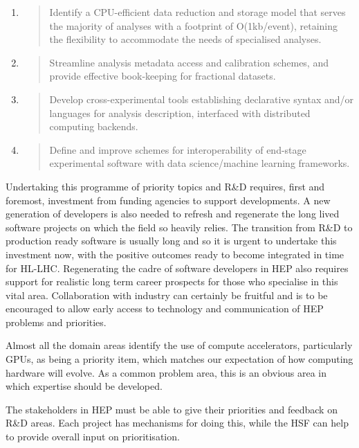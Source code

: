 \documentclass[10pt,a4paper]{article}
\begin{document}
\begin{enumerate}
\def\labelenumi{\arabic{enumi}.}
\item
  \begin{quote}
  Identify a CPU-efficient data reduction and storage model that serves
  the majority of analyses with a footprint of O(1kb/event), retaining
  the flexibility to accommodate the needs of specialised analyses.
  \end{quote}
\item
  \begin{quote}
  Streamline analysis metadata access and calibration schemes, and
  provide effective book-keeping for fractional datasets.
  \end{quote}
\item
  \begin{quote}
  Develop cross-experimental tools establishing declarative syntax
  and/or languages for analysis description, interfaced with distributed
  computing backends.
  \end{quote}
\item
  \begin{quote}
  Define and improve schemes for interoperability of end-stage
  experimental software with data science/machine learning frameworks.
  \end{quote}
\end{enumerate}

Undertaking this programme of priority topics and R\&D requires, first
and foremost, investment from funding agencies to support developments.
A new generation of developers is also needed to refresh and regenerate
the long lived software projects on which the field so heavily relies.
The transition from R\&D to production ready software is usually long
and so it is urgent to undertake this investment now, with the positive
outcomes ready to become integrated in time for HL-LHC. Regenerating the
cadre of software developers in HEP also requires support for realistic
long term career prospects for those who specialise in this vital area.
Collaboration with industry can certainly be fruitful and is to be
encouraged to allow early access to technology and communication of HEP
problems and priorities.

Almost all the domain areas identify the use of compute accelerators,
particularly GPUs, as being a priority item, which matches our
expectation of how computing hardware will evolve. As a common problem
area, this is an obvious area in which expertise should be developed.

The stakeholders in HEP must be able to give their priorities and
feedback on R\&D areas. Each project has mechanisms for doing this,
while the HSF can help to provide overall input on prioritisation.


\sloppy
\raggedright
\clearpage
\printbibliography[title={References},heading=bibintoc]
\end{document}
